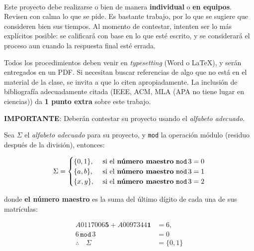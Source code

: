 \documentclass[8pt, onside]{article}
\title{
    \myclass \\
    \textbf{\mytitle} \\
    \myheader
    \date{}
}
\begin{document}
\maketitle

\vspace{-1.5cm}

Este proyecto debe realizarse o bien de manera \textbf{individual} o \textbf{en equipos}.
Revisen con calma lo que se pide. Es bastante trabajo, por lo que se sugiere que consideren bien sus tiempos.
Al momento de contestar, intenten ser lo más explícitos posible: se calificará con base en lo que esté escrito, y se considerará el proceso aun cuando la respuesta final esté errada.

\vspace{1.5ex}

Todos los procedimientos deben venir en \textit{typesetting} (Word o \LaTeX), y serán entregados en un PDF.
Si necesitan buscar referencias de algo que no está en el material de la clase, se invita a que lo citen apropiadamente.
La inclusión de bibliografía adecuadamente citada (IEEE, ACM, MLA {\tiny (APA no tiene lugar en ciencias)}) da \textbf{1 punto extra} sobre este trabajo.

\vspace{1.5ex}

\textbf{IMPORTANTE}: Deberán contestar su proyecto usando el \textit{alfabeto adecuado}.

\vspace{1.5ex}

Sea $\Sigma$ el \textit{alfabeto adecuado} para su proyecto, y \texttt{mod} la operación módulo (residuo después de la división), entonces:

$$ \Sigma = 
\begin{cases}
   \{0,1\}, & \text{ si el \textbf{número maestro} } \mathtt{mod} \, 3 = 0 \\
   \{a,b\}, & \text{ si el \textbf{número maestro} } \mathtt{mod} \, 3 = 1 \\
   \{x,y\}, & \text{ si el \textbf{número maestro} } \mathtt{mod} \, 3 = 2 \\
\end{cases}
$$

donde \textbf{el número maestro} es la suma del último dígito de cada una de sus matrículas:

\begin{align*}
    A0117006\mathbf{5} + A0097344\mathbf{1} & =  6, \\
    6 \, \mathtt{mod} \, 3 & = 0 \\
    \therefore \quad \Sigma & = \{0,1\}
\end{align*}
\end{document}

